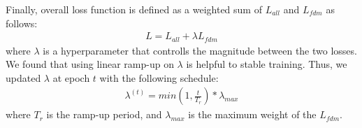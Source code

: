 Finally, overall loss function is defined as a weighted sum of $L_{all}$ and $L_{fdm}$ as follows:
\begin{equation}
\label{eq:overall}
\begin{aligned}
L = L_{all} + \lambda L_{fdm}
\end{aligned}
\end{equation}
where $\lambda$ is a hyperparameter that controlls the magnitude between the two losses. We found that using linear ramp-up on $\lambda$ is helpful to stable training. Thus, we updated $\lambda$ at epoch $t$ with the following schedule:
\begin{equation}
\label{eq:rampup}
\begin{aligned}
\lambda^{(t)} = min(1, \frac{t}{T_r}) * \lambda_{max}
\end{aligned}
\end{equation}
where $T_r$ is the ramp-up period, and $\lambda_{max}$ is the maximum weight of the $L_{fdm}$.

